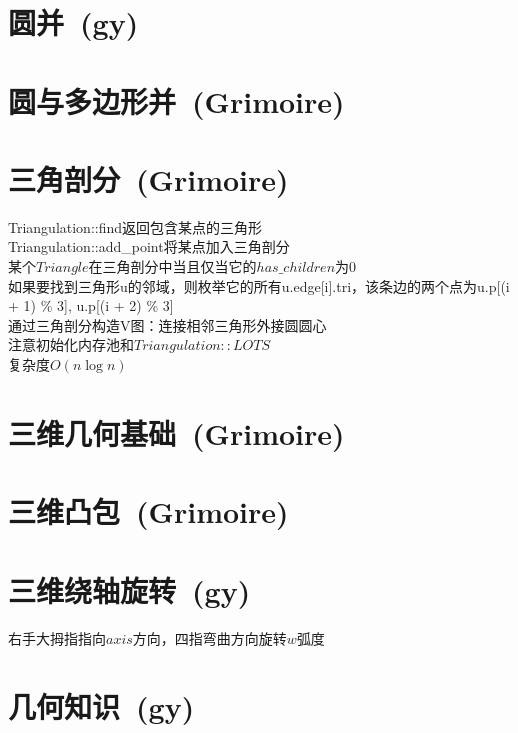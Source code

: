 \section{圆并~\small(gy)}

\section{圆与多边形并~\small(Grimoire)}

\section{三角剖分~\small(Grimoire)}
    \noindent Triangulation::find返回包含某点的三角形
    \\Triangulation::add\_point将某点加入三角剖分
    \\某个$ Triangle $在三角剖分中当且仅当它的$ has\_children $为$ 0 $
    \\如果要找到三角形u的邻域，则枚举它的所有u.edge[i].tri，该条边的两个点为u.p[(i + 1) \% 3], u.p[(i + 2) \% 3]
    \\通过三角剖分构造V图：连接相邻三角形外接圆圆心
    \\注意初始化内存池和$ Triangulation::LOTS $
    \\复杂度$ O(n \log n) $

\section{三维几何基础~\small(Grimoire)}

\section{三维凸包~\small(Grimoire)}

\section{三维绕轴旋转~\small(gy)}
    右手大拇指指向$ axis $方向，四指弯曲方向旋转$ w $弧度

\section{几何知识~\small(gy)}
    
